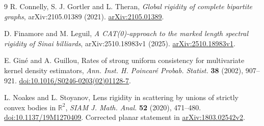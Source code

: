 \begin{thebibliography}{9}
R. Connelly, S. J. Gortler and L. Theran,
\emph{Global rigidity of complete bipartite graphs},
arXiv:2105.01389 (2021).
\href{https://arxiv.org/abs/2105.01389}{arXiv:2105.01389}.

D. Finamore and M. Leguil,
\emph{A CAT(0)-approach to the marked length spectral rigidity of Sinai billiards},
arXiv:2510.18983v1 (2025).
\href{https://arxiv.org/abs/2510.18983v1}{arXiv:2510.18983v1}.

E. Gin\'e and A. Guillou,
Rates of strong uniform consistency for multivariate kernel density
estimators, \emph{Ann. Inst. H. Poincar\'e Probab. Statist.}
\textbf{38} (2002), 907--921.
\href{https://doi.org/10.1016/S0246-0203(02)01128-7}{doi:10.1016/S0246-0203(02)01128-7}.

L. Noakes and L. Stoyanov,
Lens rigidity in scattering by unions of strictly convex bodies in
$\mathbb R^2$, \emph{SIAM J. Math. Anal.} \textbf{52} (2020), 471--480.
\href{https://doi.org/10.1137/19M1270409}{doi:10.1137/19M1270409}.
Corrected planar statement in
\href{https://arxiv.org/abs/1803.02542v2}{arXiv:1803.02542v2}.
\end{thebibliography}

